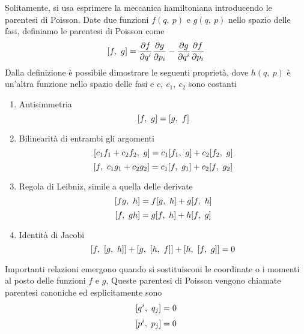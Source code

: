     Solitamente, si usa esprimere la meccanica hamiltoniana introducendo le parentesi di Poisson. Date due funzioni $f(q, ~p)$ e $g(q, ~p)$ nello spazio delle fasi, definiamo le parentesi di Poisson come
    \begin{equation} \label{poisson}
        [f, ~g] = \frac{\partial f}{\partial q^i} \frac{\partial g}{\partial p_i} - \frac{\partial g}{\partial q^i} \frac{\partial f}{\partial p_i}
    \end{equation}
    Dalla definizione è possibile dimostrare le seguenti proprietà, dove $h(q, ~p)$ è un'altra funzione nello spazio delle fasi e $c, ~c_1, ~c_2$ sono costanti
    \begin{enumerate}
        \item Antisimmetria
    \begin{equation*}
        [f, ~g] = [g, ~f]
    \end{equation*}
        \item Bilinearità di entrambi gli argomenti
    \begin{equation*}
        [c_1f_1+c_2f_2, ~g] = c_1 [f_1, ~g] + c_2 [f_2, ~g]
    \end{equation*}
    \begin{equation*}
        [f, ~c_1g_1+c_2g_2] = c_1 [f, ~g_1] + c_2 [f, ~g_2]
    \end{equation*}
        \item Regola di Leibniz, simile a quella delle derivate
    \begin{equation*}
        [fg, ~h] = f [g, ~h] + g [f, ~h]
    \end{equation*}
    \begin{equation*}
        [f, ~gh] = g [f, ~h] + h [f, ~g]
    \end{equation*}
        \item Identità di Jacobi
    \begin{equation} \label{jacobi}
        [f, ~[g, ~h]] + [g, ~[h, ~f]] + [h, ~[f, ~g]] = 0
    \end{equation}
    \end{enumerate}
    Importanti relazioni emergono quando si sostituisconi le coordinate o i momenti al posto delle funzioni $f$ e $g$, Queste parentesi di Poisson vengono chiamate parentesi canoniche ed esplicitamente sono 
    \begin{equation} \label{canq}
        [q^i, ~q_j] = 0
    \end{equation}
    \begin{equation} \label{canp}
        [p^i, ~p_j] = 0
    \end{equation}

